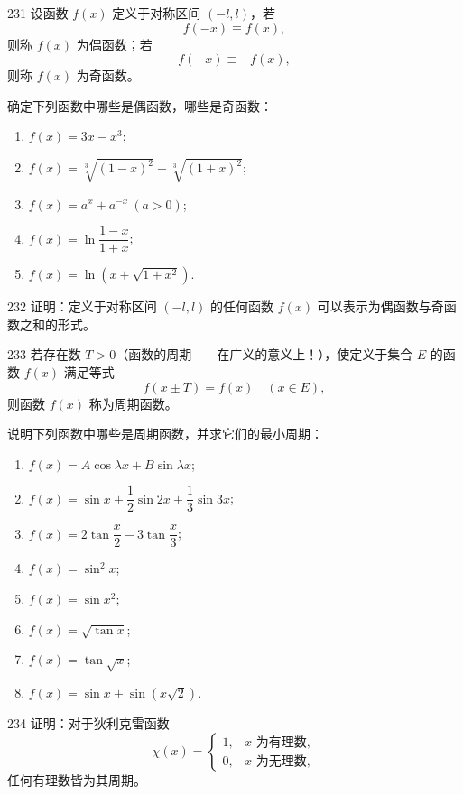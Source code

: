 \begin{prob}[L]{231}
设函数 $f(x)$ 定义于对称区间 $(-l, l)$，若
\[
f(-x) \equiv f(x),
\]
则称 $f(x)$ 为偶函数；若
\[
f(-x) \equiv -f(x),
\]
则称 $f(x)$ 为奇函数。

确定下列函数中哪些是偶函数，哪些是奇函数：
\begin{enumerate}[label=(\alph*), itemsep=2pt, topsep=3pt]
\item $f(x) = 3x - x^3$;
\item $f(x) = \sqrt[3]{(1 - x)^2} + \sqrt[3]{(1 + x)^2}$;
\item $f(x) = a^x + a^{-x}\ (a > 0)$;
\item $f(x) = \ln\dfrac{1 - x}{1 + x}$;
\item $f(x) = \ln\!\left(x + \sqrt{1 + x^2}\right)$.
\end{enumerate}
\end{prob}

\begin{prob}[M]{232}
证明：定义于对称区间 $(-l, l)$ 的任何函数 $f(x)$ 可以表示为偶函数与奇函数之和的形式。
\end{prob}

\begin{prob}[L]{233}
若存在数 $T > 0$（函数的周期——在广义的意义上！），使定义于集合 $E$ 的函数 $f(x)$ 满足等式
\[
f(x \pm T) = f(x) \quad (x \in E),
\]
则函数 $f(x)$ 称为周期函数。

说明下列函数中哪些是周期函数，并求它们的最小周期：
\begin{enumerate}[label=(\alph*), itemsep=2pt, topsep=3pt]
\item $f(x) = A\cos\lambda x + B\sin\lambda x$;
\item $f(x) = \sin x + \dfrac{1}{2}\sin 2x + \dfrac{1}{3}\sin 3x$;
\item $f(x) = 2\tan\dfrac{x}{2} - 3\tan\dfrac{x}{3}$;
\item $f(x) = \sin^2 x$;
\item $f(x) = \sin x^2$;
\item $f(x) = \sqrt{\tan x}$;
\item $f(x) = \tan\sqrt{x}$;
\item $f(x) = \sin x + \sin(x\sqrt{2})$.
\end{enumerate}
\end{prob}

\begin{prob}[M]{234}
证明：对于狄利克雷函数
\[
\chi(x) = \begin{cases}
1, & x\text{ 为有理数}, \\
0, & x\text{ 为无理数},
\end{cases}
\]
任何有理数皆为其周期。
\end{prob}

